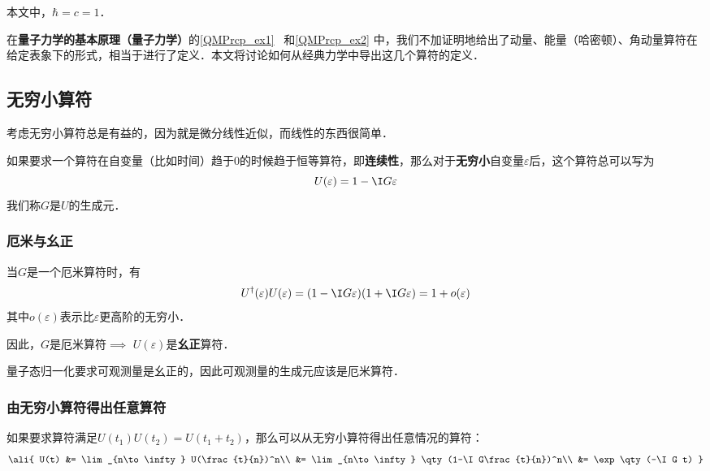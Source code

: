 

本文中，$\hbar=c=1$．

在\textbf{量子力学的基本原理（量子力学）}的\autoref{QMPrcp_ex1}~ 和\autoref{QMPrcp_ex2} 中，我们不加证明地给出了动量、能量（哈密顿）、角动量算符在给定表象下的形式，相当于进行了定义．本文将讨论如何从经典力学中导出这几个算符的定义．

\subsection{无穷小算符}



考虑无穷小算符总是有益的，因为就是微分线性近似，而线性的东西很简单．

如果要求一个算符在自变量（比如时间）趋于$0$的时候趋于恒等算符，即\textbf{连续性}，那么对于\textbf{无穷小}自变量$\varepsilon$后，这个算符总可以写为
\begin{equation}\label{OprQM_eq1}
U(\varepsilon) = 1-\I G\varepsilon
\end{equation}
我们称$G$是$U$的生成元．

\subsubsection{厄米与幺正}

当$G$是一个厄米算符时，有
\begin{equation}
U^{\dagger}(\varepsilon)U(\varepsilon) = (1-\I G\varepsilon)(1+\I G\varepsilon) = 1+o(\varepsilon)
\end{equation}
其中$o(\varepsilon)$表示比$\varepsilon$更高阶的无穷小．

因此，$G$是厄米算符$\implies$ $U(\varepsilon)$是\textbf{幺正}算符．

量子态归一化要求可观测量是幺正的，因此可观测量的生成元应该是厄米算符．


\subsubsection{由无穷小算符得出任意算符}

如果要求算符满足$U(t_1)U(t_2)=U(t_1+t_2)$，那么可以从无穷小算符得出任意情况的算符：
\begin{equation}
\ali{
    U(t) &= \lim_{n\to\infty}  U(\frac{t}{n})^n\\
    &= \lim_{n\to\infty} \qty(1-\I G\frac{t}{n})^n\\
    &= \exp\qty(-\I G t)
}
\end{equation}



